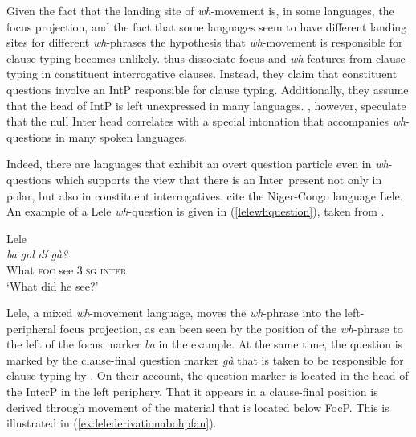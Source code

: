\noindent Given the fact that the landing site of \textit{wh}-movement is, in some languages, the focus projection, and the fact that some languages seem to have different landing sites for different \textit{wh}-phrases the hypothesis that \textit{wh}-movement is responsible for clause-typing becomes unlikely. \citet{aboh2010sa} thus dissociate focus and \textit{wh}-features from clause-typing in constituent interrogative clauses. Instead, they claim that constituent questions involve an IntP responsible for clause typing. Additionally, they assume that the head of IntP is left unexpressed in many languages. \citet{aboh2010sa}, however, speculate that the null Inter head correlates with a special intonation that accompanies \textit{wh}-questions in many spoken languages.

Indeed, there are languages that exhibit an overt question particle even in \textit{wh}-questions which supports the view that there is an Inter\textdegree\ present not only in polar, but also in constituent interrogatives. \citet{aboh2010sa} cite the Niger-Congo language Lele. An example of a Lele \textit{wh}-question is given in (\ref{lelewhquestion}), taken from \citet[286]{frajzyngier2001grammar}.


\begin{exe}
\ex Lele \citep[286]{frajzyngier2001grammar} \\  {\textit{ba}} {\textit{gol}} {\textit{dí}} {\textit{gà?}} \\
{What} {\textsc{foc}} {see} {3.\textsc{sg}} {\textsc{inter}} \\
\trans `What did he see?' \label{lelewhquestion}
\end{exe}

\noindent Lele, a mixed \textit{wh}-movement language, moves the \textit{wh}-phrase into the left-pe\-riph\-er\-al focus projection, as can been seen by the position of the \textit{wh}-phrase to the left of the focus marker \textit{ba} in the example. At the same time, the question is marked by the clause-final question marker \textit{gà} that is taken to be responsible for clause-typing by \citet{aboh2010sa}. On their account, the question marker is located in the head of the InterP in the left periphery. That it appears in a clause-final position is derived through movement of the material that is located below FocP. This is illustrated in (\ref{ex:lelederivationabohpfau}).

